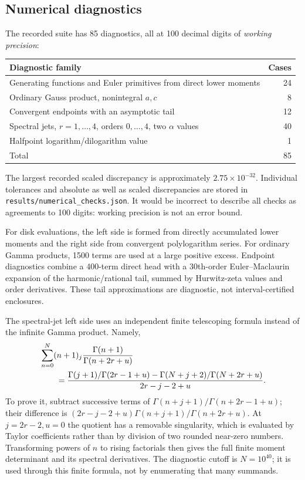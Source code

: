 \documentclass[11pt,letterpaper]{article}
\numberwithin{equation}{section}
\theoremstyle{definition}\newtheorem{definition}[theorem]{Definition}
\theoremstyle{remark}\newtheorem{remark}[theorem]{Remark}
\begin{document}
\subsection{Numerical diagnostics}
The recorded suite has 85 diagnostics, all at 100 decimal digits of
\emph{working precision}:
\begin{center}
\small
\begin{tabular}{lr}
\toprule
Diagnostic family & Cases\\
\midrule
Generating functions and Euler primitives from direct lower moments & 24\\
Ordinary Gauss product, nonintegral $a,c$ & 8\\
Convergent endpoints with an asymptotic tail & 12\\
Spectral jets, $r=1,\ldots,4$, orders $0,\ldots,4$, two $\alpha$ values & 40\\
Halfpoint logarithm/dilogarithm value & 1\\
\midrule
Total & 85\\
\bottomrule
\end{tabular}
\end{center}
The largest recorded scaled discrepancy is approximately
$2.75\times10^{-32}$. Individual tolerances and absolute as well as
scaled discrepancies are stored in \texttt{results/numerical\_checks.json}.
It would be incorrect to describe all checks as agreements to 100
digits: working precision is not an error bound.

For disk evaluations, the left side is formed from directly accumulated
lower moments and the right side from convergent polylogarithm series.
For ordinary Gamma products, 1500 terms are used at a large positive
excess. Endpoint diagnostics combine a 400-term direct head with a
30th-order Euler--Maclaurin expansion of the harmonic/rational tail,
summed by Hurwitz-zeta values and order derivatives. These tail
approximations are diagnostic, not interval-certified enclosures.

The spectral-jet left side uses an independent finite telescoping
formula instead of the infinite Gamma product. Namely,
\begin{align}
 &\sum_{n=0}^N(n+1)_j
       \frac{\Gamma(n+1)}{\Gamma(n+2r+u)}\notag\\
 &\qquad=
 \frac{\Gamma(j+1)/\Gamma(2r-1+u)
             -\Gamma(N+j+2)/\Gamma(N+2r+u)}{2r-j-2+u}.
 \label{dhr:eq:finite-jet-telescope}
\end{align}
To prove it, subtract successive terms of
$\Gamma(n+j+1)/\Gamma(n+2r-1+u)$; their difference is
$(2r-j-2+u)\Gamma(n+j+1)/\Gamma(n+2r+u)$.
At $j=2r-2,u=0$ the quotient has a removable singularity, which
is evaluated by Taylor coefficients rather than by division of two
rounded near-zero numbers. Transforming powers of $n$ to rising
factorials then gives the full finite moment determinant and its
spectral derivatives. The diagnostic cutoff is $N=10^{40}$;
it is used through this finite formula, not by enumerating that
many summands.
\end{document}

